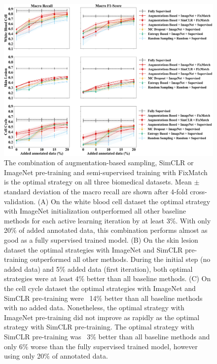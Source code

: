 \begin{figure}[htbp]
\centering
\captionsetup{format=plain}
\includegraphics[width=\textwidth]{figures/fig_3_recall_f1.png}
\caption{The combination of augmentation-based sampling, SimCLR or ImageNet pre-training and semi-supervised training with FixMatch is the optimal strategy on all three biomedical datasets. Mean $\pm$ standard deviation of the macro recall are shown after 4-fold cross-validation. (A) On the white blood cell dataset the optimal strategy with ImageNet initialization outperformed all other baseline methods for each active learning iteration by at least 3\%. With only 20\% of added annotated data, this combination performs almost as good as a fully supervised trained model. (B) On the skin lesion dataset the optimal strategies with ImageNet and SimCLR pre-training outperformed all other methods. During the initial step (no added data) and 5\% added data (first iteration), both optimal strategies were at least 4\% better than all baseline methods. (C) On the cell cycle dataset the optimal strategies with ImageNet and SimCLR pre-training were ~14\% better than all baseline methods with no added data. Nonetheless, the optimal strategy with ImageNet pre-training did not improve as rapidly as the optimal strategy with SimCLR pre-training. The optimal strategy with SimCLR pre-training was ~3\% better than all baseline methods and only 6\% worse than the fully supervised trained model, however using only 20\% of annotated data.}
\label{fig:all_recall_f1}
\end{figure}

\newpage

